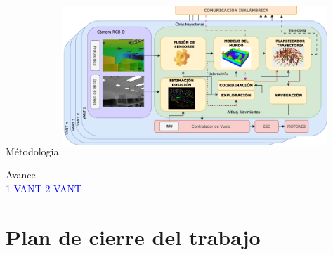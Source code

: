 \documentclass[24pt,aspectratio=169]{beamer}
\begin{document}
\begin{frame}{Métodologia}
  \centering
  \includegraphics[width=10cm, height=6cm]{arquitectura}
\end{frame}

\begin{frame}{Avance}
  \bigskip %
  \centering
  \hfil
  \vspace{2pt}\\
  \textcolor{blue}{1 VANT}
  \hfil
  \textcolor{blue}{2 VANT}
\end{frame}


\section*{Plan de cierre del trabajo}
\end{document}
